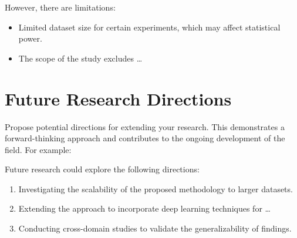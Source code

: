 However, there are limitations:
\begin{itemize}
    \item Limited dataset size for certain experiments, which may affect statistical power.
    \item The scope of the study excludes \dots
\end{itemize}

\section{Future Research Directions}\label{sec:future-research}
Propose potential directions for extending your research. This demonstrates a forward-thinking approach and contributes to the ongoing development of the field. For example:

Future research could explore the following directions:
\begin{enumerate}
    \item Investigating the scalability of the proposed methodology to larger datasets.
    \item Extending the approach to incorporate deep learning techniques for \dots
    \item Conducting cross-domain studies to validate the generalizability of findings.
\end{enumerate}
